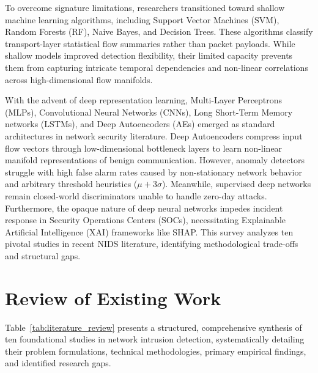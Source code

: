 \documentclass[12pt,a4paper]{report}
\begin{document}
To overcome signature limitations, researchers transitioned toward shallow machine learning algorithms, including Support Vector Machines (SVM), Random Forests (RF), Naive Bayes, and Decision Trees. These algorithms classify transport-layer statistical flow summaries rather than packet payloads. While shallow models improved detection flexibility, their limited capacity prevents them from capturing intricate temporal dependencies and non-linear correlations across high-dimensional flow manifolds.

With the advent of deep representation learning, Multi-Layer Perceptrons (MLPs), Convolutional Neural Networks (CNNs), Long Short-Term Memory networks (LSTMs), and Deep Autoencoders (AEs) emerged as standard architectures in network security literature. Deep Autoencoders compress input flow vectors through low-dimensional bottleneck layers to learn non-linear manifold representations of benign communication. However, anomaly detectors struggle with high false alarm rates caused by non-stationary network behavior and arbitrary threshold heuristics ($\mu + 3\sigma$). Meanwhile, supervised deep networks remain closed-world discriminators unable to handle zero-day attacks. Furthermore, the opaque nature of deep neural networks impedes incident response in Security Operations Centers (SOCs), necessitating Explainable Artificial Intelligence (XAI) frameworks like SHAP. This survey analyzes ten pivotal studies in recent NIDS literature, identifying methodological trade-offs and structural gaps.

\clearpage
\section{Review of Existing Work}
Table~\ref{tab:literature_review} presents a structured, comprehensive synthesis of ten foundational studies in network intrusion detection, systematically detailing their problem formulations, technical methodologies, primary empirical findings, and identified research gaps.
\end{document}

